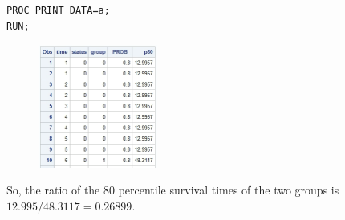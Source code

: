 \documentclass{elegantbook}
\begin{document}
\begin{solution}
\begin{enumerate}[(a)]
\begin{verbatim}
PROC PRINT DATA=a;
RUN;
            \end{verbatim}
            \begin{figure}[H]
                \centering
                \includegraphics[width=0.35\textwidth]{HW9_3d.png}
            \end{figure}
            So, the ratio of the 80 percentile survival times of the two groups is $12.995/48.3117=0.26899$. 
    \end{enumerate}
\end{solution}
\end{document}
